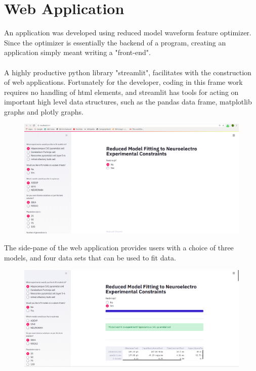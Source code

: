 \section{Web Application}
An application was developed using reduced model waveform feature optimizer. Since the optimizer is essentially the backend of a program, creating an application simply meant writing a "front-end".\\
\\
A highly productive python library "streamlit", facilitates with the construction of web applications. Fortunately for the developer, coding in this frame work requires no handling of html elements, and streamlit has tools for acting on important high level data structures, such as the pandas data frame, matplotlib graphs and plotly graphs.\\
\begin{figure}
\includegraphics[]{chapters/app_tex/web_app_thesis}
\end{figure}
The side-pane of the web application provides users with a choice of three models, and four data sets that can be used to fit data.
\begin{figure}
\includegraphics[]{chapters/app_tex/app_results}
\end{figure}

